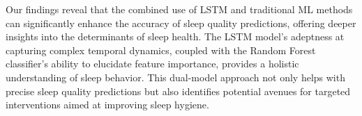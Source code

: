 \documentclass[10pt]{extarticle}
\begin{document}
Our findings reveal that the combined use of LSTM and traditional ML methods can significantly enhance the accuracy of sleep quality predictions, offering deeper insights into the determinants of sleep health. The LSTM model's adeptness at capturing complex temporal dynamics, coupled with the Random Forest classifier's ability to elucidate feature importance, provides a holistic understanding of sleep behavior. This dual-model approach not only helps with precise sleep quality predictions but also identifies potential avenues for targeted interventions aimed at improving sleep hygiene.









\end{document}

